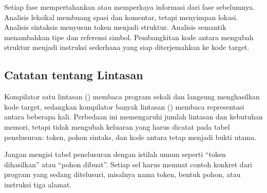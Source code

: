 Setiap fase mempertahankan atau memperkaya informasi dari fase
sebelumnya. Analisis leksikal membuang spasi dan komentar, tetapi
menyimpan lokasi. Analisis sintaksis menyusun token menjadi struktur.
Analisis semantik menambahkan tipe dan referensi simbol. Pembangkitan
kode antara mengubah struktur menjadi instruksi sederhana yang siap
diterjemahkan ke kode target.

\subsection{Catatan tentang Lintasan}

Kompilator satu lintasan () membaca program
sekali dan langsung menghasilkan kode target, sedangkan kompilator
banyak lintasan () membaca representasi
antara beberapa kali. Perbedaan ini memengaruhi jumlah lintasan dan
kebutuhan memori, tetapi tidak mengubah keluaran yang harus dicatat
pada tabel penelusuran: token, pohon sintaks, dan kode antara tetap
menjadi bukti utama.

\begin{warningbox}
Jangan mengisi tabel penelusuran dengan istilah umum seperti
``token dihasilkan'' atau ``pohon dibuat''. Setiap sel harus memuat
contoh konkret dari program yang sedang ditelusuri, misalnya nama
token, bentuk pohon, atau instruksi tiga alamat.
\end{warningbox}
